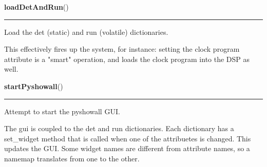     \label{start_pydsp:loadDetAndRun}

    \vspace{0.5ex}

    \begin{boxedminipage}{\textwidth}

    \raggedright \textbf{loadDetAndRun}()

    \vspace{-1.5ex}

    \rule{\textwidth}{0.5\fboxrule}
    Load the det (static) and run (volatile) dictionaries.

    This effectively fires up the system, for instance: setting the clock 
    program attribute is a "smart" operation, and loads the clock program 
    into the DSP as well.

    \vspace{1ex}

    \end{boxedminipage}

    \label{start_pydsp:startPyshowall}

    \vspace{0.5ex}

    \begin{boxedminipage}{\textwidth}

    \raggedright \textbf{startPyshowall}()

    \vspace{-1.5ex}

    \rule{\textwidth}{0.5\fboxrule}
    Attempt to start the pyshowall GUI.

    The gui is coupled to the det and run dictionaries. Each dictionary has
    a set\_widget method that is called when one of the attribuetes is 
    changed. This updates the GUI. Some widget names are different from 
    attribute names, so a namemap translates from one to the other.

    \vspace{1ex}

    \end{boxedminipage}



